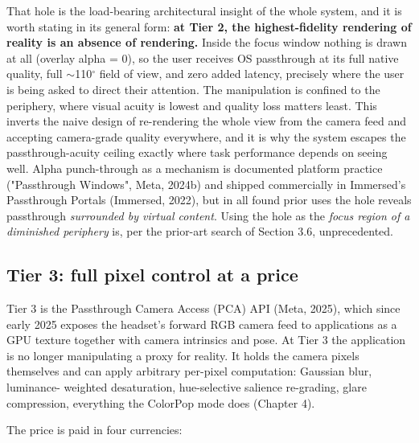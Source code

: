 That hole is the load-bearing architectural insight of the whole system, and it is worth stating in
its general form: \textbf{at Tier 2, the highest-fidelity rendering of reality is an absence of
rendering.} Inside the focus window nothing is drawn at all (overlay alpha = 0), so the user
receives OS passthrough at its full native quality, full $\sim$110$^{\circ}$ field of view, and zero added
latency, precisely where the user is being asked to direct their attention. The manipulation is
confined to the periphery, where visual acuity is lowest and quality loss matters least. This
inverts the naive design of re-rendering the whole view from the camera feed and accepting
camera-grade quality everywhere, and it is why the system escapes the passthrough-acuity ceiling
exactly where task performance depends on seeing well. Alpha punch-through as a mechanism is
documented platform practice ("Passthrough Windows", Meta, 2024b) and shipped commercially in
Immersed's Passthrough Portals (Immersed, 2022), but in all found prior uses the hole reveals
passthrough \textit{surrounded by virtual content}. Using the hole as the \textit{focus region of a diminished
periphery} is, per the prior-art search of Section 3.6, unprecedented.

\subsection{Tier 3: full pixel control at a price}

Tier 3 is the Passthrough Camera Access (PCA) API (Meta, 2025), which since early 2025 exposes the
headset's forward RGB camera feed to applications as a GPU texture together with camera intrinsics
and pose. At Tier 3 the application is no longer manipulating a proxy for reality. It holds the
camera pixels themselves and can apply arbitrary per-pixel computation: Gaussian blur, luminance-
weighted desaturation, hue-selective salience re-grading, glare compression, everything the ColorPop mode does (Chapter 4).

The price is paid in four currencies:

